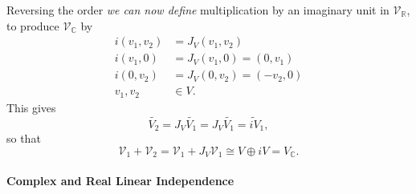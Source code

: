 \documentclass[aps,preprint]{revtex4}
\begin{document}
Reversing the order \emph{we can now define} multiplication by an imaginary
unit in $\mathcal{V}_{\mathbb{R}}$, to produce $\mathcal{V}_{\mathbb{C}}$ by 
\begin{align}
i\left( v_{1},v_{2}\right) & =J_{V}\left( v_{1},v_{2}\right) \\
i\left( v_{1},0\right) & =J_{V}\left( v_{1},0\right) =\left( 0,v_{1}\right)
\\
i\left( 0,v_{2}\right) & =J_{V}\left( 0,v_{2}\right) =\left( -v_{2},0\right)
\\
v_{1},v_{2} & \in V.
\end{align}
This gives 
\begin{equation}
\widetilde{V_{2}}=J_{V}\widetilde{V_{1}}=J_{V}\widetilde{V_{1}}=\widetilde{iV%
}_{1},
\end{equation}
so that 
\begin{equation}
\mathcal{V}_{1}+\mathcal{V}_{2}=\mathcal{V}_{1}+J_{V}\mathcal{V}_{1}\cong
V\oplus iV=V_{\mathbb{C}}.
\end{equation}

\paragraph{Complex and Real Linear Independence}
\end{document}
